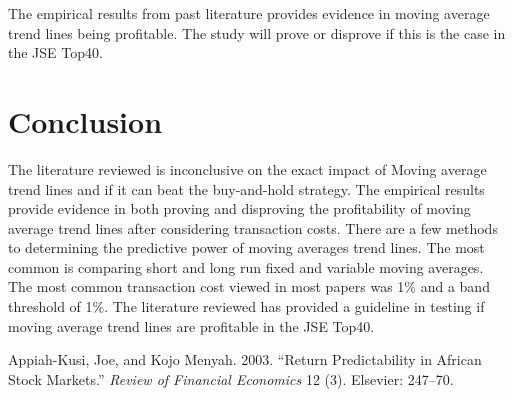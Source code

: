 \documentclass[12pt,preprint, authoryear]{elsarticle}
\numberwithin{equation}{section}
\numberwithin{figure}{section}
\numberwithin{table}{section}
\begin{document}
The empirical results from past literature provides evidence in moving
average trend lines being profitable. The study will prove or disprove
if this is the case in the JSE Top40.

\section{Conclusion}\label{conclusion}

The literature reviewed is inconclusive on the exact impact of Moving
average trend lines and if it can beat the buy-and-hold strategy. The
empirical results provide evidence in both proving and disproving the
profitability of moving average trend lines after considering
transaction costs. There are a few methods to determining the predictive
power of moving averages trend lines. The most common is comparing short
and long run fixed and variable moving averages. The most common
transaction cost viewed in most papers was 1\% and a band threshold of
1\%. The literature reviewed has provided a guideline in testing if
moving average trend lines are profitable in the JSE Top40.

\hypertarget{refs}{}
\hypertarget{ref-appiah2003return}{}
Appiah-Kusi, Joe, and Kojo Menyah. 2003. ``Return Predictability in
African Stock Markets.'' \emph{Review of Financial Economics} 12 (3).
Elsevier: 247--70.

\newpage
\nocite{*}

\end{document}

